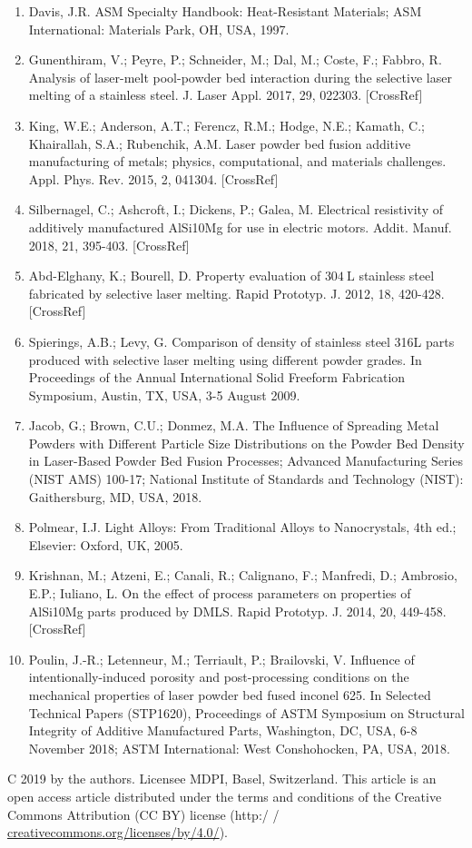 \documentclass[10pt]{article}
\begin{document}
\begin{enumerate}
  \item Davis, J.R. ASM Specialty Handbook: Heat-Resistant Materials; ASM International: Materials Park, OH, USA, 1997.

  \item Gunenthiram, V.; Peyre, P.; Schneider, M.; Dal, M.; Coste, F.; Fabbro, R. Analysis of laser-melt pool-powder bed interaction during the selective laser melting of a stainless steel. J. Laser Appl. 2017, 29, 022303. [CrossRef]

  \item King, W.E.; Anderson, A.T.; Ferencz, R.M.; Hodge, N.E.; Kamath, C.; Khairallah, S.A.; Rubenchik, A.M. Laser powder bed fusion additive manufacturing of metals; physics, computational, and materials challenges. Appl. Phys. Rev. 2015, 2, 041304. [CrossRef]

  \item Silbernagel, C.; Ashcroft, I.; Dickens, P.; Galea, M. Electrical resistivity of additively manufactured AlSi10Mg for use in electric motors. Addit. Manuf. 2018, 21, 395-403. [CrossRef]

  \item Abd-Elghany, K.; Bourell, D. Property evaluation of $304 \mathrm{~L}$ stainless steel fabricated by selective laser melting. Rapid Prototyp. J. 2012, 18, 420-428. [CrossRef]

  \item Spierings, A.B.; Levy, G. Comparison of density of stainless steel 316L parts produced with selective laser melting using different powder grades. In Proceedings of the Annual International Solid Freeform Fabrication Symposium, Austin, TX, USA, 3-5 August 2009.

  \item Jacob, G.; Brown, C.U.; Donmez, M.A. The Influence of Spreading Metal Powders with Different Particle Size Distributions on the Powder Bed Density in Laser-Based Powder Bed Fusion Processes; Advanced Manufacturing Series (NIST AMS) 100-17; National Institute of Standards and Technology (NIST): Gaithersburg, MD, USA, 2018.

  \item Polmear, I.J. Light Alloys: From Traditional Alloys to Nanocrystals, 4th ed.; Elsevier: Oxford, UK, 2005.

  \item Krishnan, M.; Atzeni, E.; Canali, R.; Calignano, F.; Manfredi, D.; Ambrosio, E.P.; Iuliano, L. On the effect of process parameters on properties of AlSi10Mg parts produced by DMLS. Rapid Prototyp. J. 2014, 20, 449-458. [CrossRef]

  \item Poulin, J.-R.; Letenneur, M.; Terriault, P.; Brailovski, V. Influence of intentionally-induced porosity and post-processing conditions on the mechanical properties of laser powder bed fused inconel 625. In Selected Technical Papers (STP1620), Proceedings of ASTM Symposium on Structural Integrity of Additive Manufactured Parts, Washington, DC, USA, 6-8 November 2018; ASTM International: West Conshohocken, PA, USA, 2018.

\end{enumerate}

C 2019 by the authors. Licensee MDPI, Basel, Switzerland. This article is an open access article distributed under the terms and conditions of the Creative Commons Attribution (CC BY) license (http:/ / \href{http://creativecommons.org/licenses/by/4.0/}{creativecommons.org/licenses/by/4.0/}).
\end{document}
